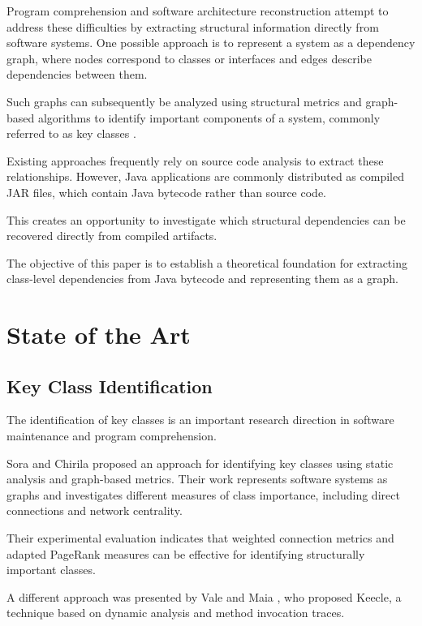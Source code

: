 \documentclass[conference]{IEEEtran}
\begin{document}
	Program comprehension and software architecture
	reconstruction attempt to address these difficulties
	by extracting structural information directly
	from software systems. One possible approach
	is to represent a system as a dependency graph,
	where nodes correspond to classes or interfaces
	and edges describe dependencies between them.
	
	Such graphs can subsequently be analyzed using
	structural metrics and graph-based algorithms
	to identify important components of a system,
	commonly referred to as key classes \cite{b1}.
	
	Existing approaches frequently rely on source
	code analysis to extract these relationships.
	However, Java applications are commonly
	distributed as compiled JAR files, which
	contain Java bytecode rather than source code.
	
	This creates an opportunity to investigate
	which structural dependencies can be recovered
	directly from compiled artifacts.
	
	The objective of this paper is to establish
	a theoretical foundation for extracting
	class-level dependencies from Java bytecode
	and representing them as a graph.
	
	
	\section{State of the Art}
	
	\subsection{Key Class Identification}
	
	The identification of key classes is an
	important research direction in software
	maintenance and program comprehension.
	
	Sora and Chirila \cite{b1} proposed an approach
	for identifying key classes using static
	analysis and graph-based metrics. Their work
	represents software systems as graphs and
	investigates different measures of class
	importance, including direct connections
	and network centrality.
	
	Their experimental evaluation indicates that
	weighted connection metrics and adapted
	PageRank measures can be effective for
	identifying structurally important classes.
	
	A different approach was presented by
	Vale and Maia \cite{b2}, who proposed
	Keecle, a technique based on dynamic
	analysis and method invocation traces.
	
\end{document}
